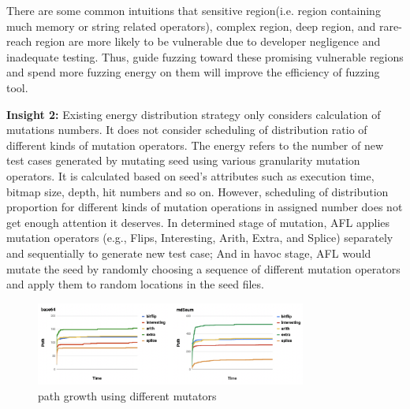 There are some common intuitions that sensitive region(i.e. region containing much memory or string related operators), complex region, deep region, and rare-reach region are more likely to be vulnerable due to developer negligence and inadequate testing. Thus, guide fuzzing toward these promising vulnerable regions and spend more fuzzing energy on them will improve the efficiency of fuzzing tool. 


%


\textbf{Insight 2: } Existing energy distribution strategy only considers calculation of mutations numbers. It does not consider scheduling of distribution ratio of different kinds of mutation operators. The energy refers to the number of new test cases generated by mutating seed using various granularity mutation operators. It is calculated based on seed's attributes such as execution time, bitmap size, depth, hit numbers and so on. However, scheduling of distribution proportion for different kinds of mutation operations in assigned number does not get enough attention it deserves. In determined stage of mutation, AFL applies mutation operators (e.g., Flips, Interesting, Arith, Extra, and Splice) separately and sequentially to generate new test case; And in havoc stage, AFL would mutate the seed by randomly choosing a sequence of different mutation operators and apply them to random locations in the seed files. 

\begin{figure}[t]
    \centering
    \includegraphics[width=3.5in]{pic/insight22.png}
    \caption{path growth using different mutators }
    \label{FineCoarseEffect}
\end{figure}

